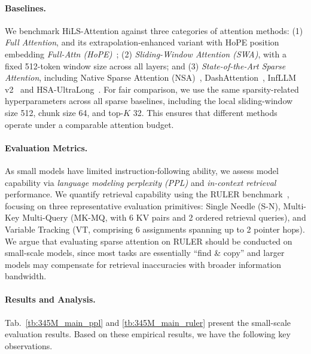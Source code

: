 \paragraph{Baselines.}
We benchmark HiLS-Attention against three categories of attention methods: 
(1) \textit{Full Attention}, and its extrapolation-enhanced variant with HoPE position embedding \textit{Full-Attn (HoPE)}~\citep{chen-etal-2025-hope};
(2) \textit{Sliding-Window Attention (SWA)},   with a fixed 512-token window size across all layers; and
(3) \textit{State-of-the-Art Sparse Attention}, including Native Sparse Attention (NSA)~\citep{yuan-etal-2025-native}, DashAttention~\citep{huang2026dashattentiondifferentiableadaptivesparse}, InfLLM v2~\citep{zhao2025infllmv2densesparseswitchableattention} and HSA-UltraLong~\citep{hu2026everytoken}. For fair comparison, we use the same sparsity-related hyperparameters across all sparse baselines, including the local sliding-window size 512, chunk size 64, and top-$K$ 32. This ensures that different methods operate under a comparable attention budget.


\paragraph{Evaluation Metrics.}
As small models have limited instruction-following ability, we assess model capability via \emph{language modeling perplexity (PPL)} and \emph{in-context retrieval} performance. We quantify retrieval capability using the RULER benchmark~\citep{hsieh2024ruler}, focusing on three representative evaluation primitives: Single Needle (S-N), Multi-Key Multi-Query (MK-MQ, with 6 KV pairs and 2 ordered retrieval queries), and Variable Tracking (VT, comprising 6 assignments spanning up to 2 pointer hops). We argue that evaluating sparse attention on RULER should be conducted on small-scale models, since most tasks are essentially ``find \& copy'' and larger models may compensate for retrieval inaccuracies with broader information bandwidth. 




\paragraph{Results and Analysis.}
Tab.~\ref{tb:345M_main_ppl} and \ref{tb:345M_main_ruler} present the small-scale evaluation results. 
Based on these empirical results, we have the following key observations. 

